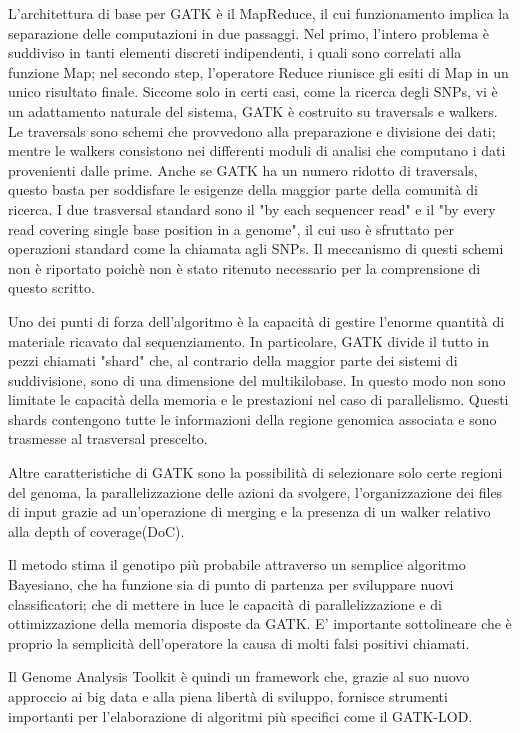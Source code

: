 L'architettura di base per GATK è il MapReduce, il cui funzionamento implica la separazione delle computazioni in due passaggi.
Nel primo, l'intero problema è suddiviso in tanti elementi discreti indipendenti, i quali sono correlati alla funzione Map; nel secondo step, l'operatore Reduce riunisce gli esiti di Map in un unico risultato finale.
Siccome solo in certi casi, come la ricerca degli SNPs, vi è un adattamento naturale del sistema, GATK è costruito su traversals e walkers.
Le traversals sono schemi che provvedono alla preparazione e divisione dei dati; mentre le walkers consistono nei differenti moduli di analisi che computano i dati provenienti dalle prime.
Anche se GATK ha un numero ridotto di traversals, questo basta per soddisfare le esigenze della maggior parte della comunità di ricerca.
I due trasversal standard sono il "by each sequencer read" e il "by every read covering single base position in a genome", il cui uso è sfruttato per operazioni standard come la chiamata agli SNPs.
Il meccanismo di questi schemi non è riportato poichè non è stato ritenuto necessario per la comprensione di questo scritto.

Uno dei punti di forza dell'algoritmo è la capacità di gestire l'enorme quantità di materiale ricavato dal sequenziamento.
In particolare, GATK divide il tutto in pezzi chiamati "shard" che, al contrario della maggior parte dei sistemi di suddivisione, sono di una dimensione del multikilobase.
In questo modo non sono limitate le capacità della memoria e le prestazioni nel caso di parallelismo.
Questi shards contengono tutte le informazioni della regione genomica associata e sono trasmesse al trasversal prescelto.

Altre caratteristiche di GATK sono la possibilità di selezionare solo certe regioni del genoma, la parallelizzazione delle azioni da svolgere, l'organizzazione dei files di input grazie ad un'operazione di merging e la presenza di un walker relativo alla depth of coverage(DoC).

Il metodo stima il genotipo più probabile attraverso un semplice algoritmo Bayesiano, che ha funzione sia di punto di partenza per sviluppare nuovi classificatori; che di mettere in luce le capacità di parallelizzazione e di ottimizzazione della memoria disposte da GATK.
E' importante sottolineare che è proprio la semplicità dell'operatore la causa di molti falsi positivi chiamati.

Il Genome Analysis Toolkit è quindi un framework che, grazie al suo nuovo approccio ai big data e alla piena libertà di sviluppo, fornisce strumenti importanti per l'elaborazione di algoritmi più specifici come il GATK-LOD.

